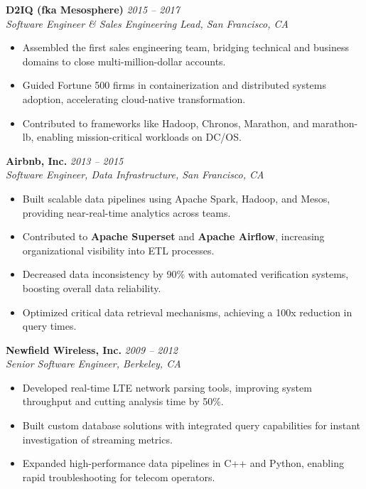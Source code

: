 \documentclass[margin,line]{resume}
\begin{document}
\begin{resume}
\filbreak
\textbf{D2IQ (fka Mesosphere)} \hfill \textit{2015 -- 2017}\\
\textit{Software Engineer \& Sales Engineering Lead, San Francisco, CA}

\begin{itemize}
    \item Assembled the first sales engineering team, bridging technical and business domains to close multi-million-dollar accounts.
    \item Guided Fortune 500 firms in containerization and distributed systems adoption, accelerating cloud-native transformation.
    \item Contributed to frameworks like Hadoop, Chronos, Marathon, and marathon-lb, enabling mission-critical workloads on DC/OS.
\end{itemize}

\filbreak
\textbf{Airbnb, Inc.} \hfill \textit{2013 -- 2015}\\
\textit{Software Engineer, Data Infrastructure, San Francisco, CA}

\begin{itemize}
    \item Built scalable data pipelines using Apache Spark, Hadoop, and Mesos, providing near-real-time analytics across teams.
    \item Contributed to \textbf{Apache Superset} and \textbf{Apache Airflow}, increasing organizational visibility into ETL processes.
    \item Decreased data inconsistency by 90\% with automated verification systems, boosting overall data reliability.
    \item Optimized critical data retrieval mechanisms, achieving a 100x reduction in query times.
\end{itemize}

\filbreak
\textbf{Newfield Wireless, Inc.} \hfill \textit{2009 -- 2012}\\
\textit{Senior Software Engineer, Berkeley, CA}

\begin{itemize}
    \item Developed real-time LTE network parsing tools, improving system throughput and cutting analysis time by 50\%.
    \item Built custom database solutions with integrated query capabilities for instant investigation of streaming metrics.
    \item Expanded high-performance data pipelines in C++ and Python, enabling rapid troubleshooting for telecom operators.
\end{itemize}


\end{resume}
\end{document}
